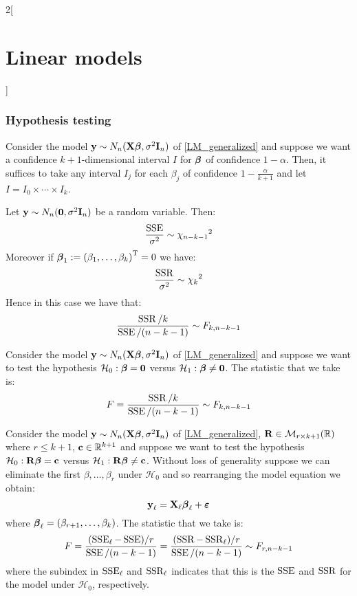 \documentclass[../../../main_math.tex]{subfiles}
\begin{document}
\begin{multicols}{2}[\section{Linear models}]
  \subsubsection{Hypothesis testing}
  \begin{proposition}
    Consider the model $\boldsymbol{\mathrm{y}}\sim N_n(\boldsymbol{\mathrm{X\beta}},\sigma^2\boldsymbol{\mathrm{I}}_n)$ of \cref{LM_generalized} and suppose we want a confidence $k+1$-dimensional interval $I$ for $\boldsymbol{\mathrm{\beta}}$ of confidence $1-\alpha$. Then, it suffices to take any interval $I_j$ for each $\beta_j$ of confidence $1-\frac{\alpha}{k+1}$ and let $I=I_0\times\cdots\times I_{k}$.
  \end{proposition}
  \begin{theorem}
    Let $\boldsymbol{\mathrm{y}}\sim N_n(\boldsymbol{\mathrm{0}},\sigma^2\boldsymbol{\mathrm{I}}_n)$ be a random variable. Then:
    $$\frac{\operatorname{SSE}}{\sigma^2}\sim{\chi_{n-k-1}}^2$$
    Moreover if $\boldsymbol{\mathrm{\beta}}_1:={(\beta_1,\ldots,\beta_k)}^{\mathrm{T}}=0$ we have:
    $$\frac{\operatorname{SSR}}{\sigma^2}\sim{\chi_{k}}^2$$
    Hence in this case we have that: $$\frac{\operatorname{SSR}/ k}{\operatorname{SSE}/(n-k-1)}\sim F_{k,n-k-1}$$
  \end{theorem}
  \begin{proposition}
    Consider the model $\boldsymbol{\mathrm{y}}\sim N_n(\boldsymbol{\mathrm{X\beta}},\sigma^2\boldsymbol{\mathrm{I}}_n)$ of \cref{LM_generalized} and suppose we want to test the hypothesis $\mathcal{H}_0:\boldsymbol{\mathrm{\beta}}=\boldsymbol{\mathrm{0}}$ versus $\mathcal{H}_1:\boldsymbol{\mathrm{\beta}}\ne\boldsymbol{\mathrm{0}}$. The statistic that we take is: $$F=\frac{\operatorname{SSR}/ k}{\operatorname{SSE}/(n-k-1)}\sim F_{k,n-k-1}$$
  \end{proposition}
  \begin{proposition}
    Consider the model $\boldsymbol{\mathrm{y}}\sim N_n(\boldsymbol{\mathrm{X\beta}},\sigma^2\boldsymbol{\mathrm{I}}_n)$ of \cref{LM_generalized}, $\boldsymbol{\mathrm{R}}\in\mathcal{M}_{r\times {k+1}}(\mathbb{R})$ where $r\leq k+1$, $\boldsymbol{\mathrm{c}}\in\mathbb{R}^{k+1}$ and suppose we want to test the hypothesis $\mathcal{H}_0:\boldsymbol{\mathrm{R}}\boldsymbol{\mathrm{\beta}}=\boldsymbol{\mathrm{c}}$ versus $\mathcal{H}_1:\boldsymbol{\mathrm{R}}\boldsymbol{\mathrm{\beta}}\ne\boldsymbol{\mathrm{c}}$.
    Without loss of generality suppose we can eliminate the first $\beta,\ldots,\beta_r$ under $\mathcal{H}_0$ and so rearranging the model equation we obtain:
    $$\boldsymbol{\mathrm{y}}_\ell=\boldsymbol{\mathrm{X}}_\ell\boldsymbol{\mathrm{\beta}}_\ell+\boldsymbol{\mathrm{\varepsilon}}$$
    where $\boldsymbol{\mathrm{\beta}}_\ell=(\beta_{r+1},\ldots,\beta_k)$. The statistic that we take is:
    \begin{equation}\label{LM_hypothesisgen}
      F=\frac{(\operatorname{SSE}_\ell-\operatorname{SSE})/ r}{\operatorname{SSE}/(n-k-1)}=\frac{(\operatorname{SSR}-\operatorname{SSR}_\ell)/ r}{\operatorname{SSE}/(n-k-1)}\sim F_{r,n-k-1}
    \end{equation}
    where the subindex in $\operatorname{SSE}_\ell$ and $\operatorname{SSR}_\ell$ indicates that this is the $\operatorname{SSE}$ and $\operatorname{SSR}$ for the model under $\mathcal{H}_0$, respectively.
  \end{proposition}

\end{multicols}
\end{document}
